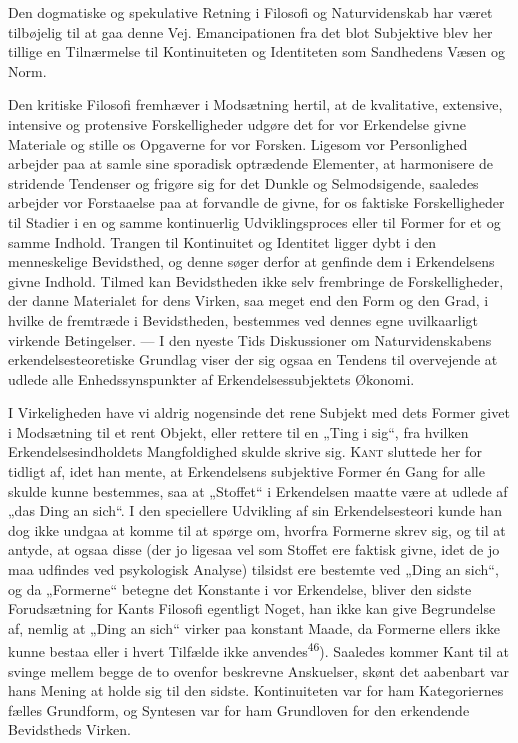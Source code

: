 \documentclass[12pt,a4paper,openany]{book}
\newcommand{\opage}[1]{\marginnote{\footnotesize\textit{[#1]}}}
\begin{document}
Den dogmatiske og spekulative Retning i Filosofi og Naturvidenskab har været
tilbøjelig til at gaa denne Vej. Emancipationen fra det blot Subjektive blev
her tillige en Tilnærmelse til Kontinuiteten og Identiteten som Sandhedens
Væsen og Norm.

Den kritiske Filosofi fremhæver i Modsætning hertil, at de kvalitative,
extensive, intensive og protensive Forskelligheder udgøre det for vor
Erkendelse givne Materiale og stille os Opgaverne for vor Forsken. Ligesom vor
Personlighed arbejder paa at samle sine sporadisk optrædende Elementer, at
harmonisere de stridende Tendenser og frigøre sig for det Dunkle og
Selmodsigende, saaledes arbejder vor Forstaaelse paa at forvandle de givne, for
os faktiske Forskelligheder til Stadier i en og samme kontinuerlig
Udviklingsproces eller til Former for et og samme Indhold. Trangen til
Kontinuitet og Identitet ligger dybt i den menneskelige Bevidsthed, og denne
søger derfor at genfinde dem i Erkendelsens givne Indhold. Tilmed kan
Bevidstheden ikke selv frembringe de Forskelligheder, der danne Materialet for
dens Virken, saa meget end den Form og den Grad, i hvilke de fremtræde i
Bevidstheden, bestemmes ved dennes egne uvilkaarligt virkende Betingelser. ---
I den nyeste Tids Diskussioner om Naturvidenskabens erkendelsesteoretiske
Grundlag viser der sig ogsaa en Tendens til overvejende at udlede alle
Enhedssynspunkter af Erkendelsessubjektets Økonomi.

I Virkeligheden have vi aldrig nogensinde det rene Subjekt
\opage{50}med dets Former givet i Modsætning til et rent Objekt, eller rettere
til en „Ting i sig“, fra hvilken Erkendelsesindholdets Mangfoldighed skulde
skrive sig. \textsc{Kant} sluttede her for tidligt af, idet han mente, at
Erkendelsens subjektive Former én Gang for alle skulde kunne bestemmes, saa at
„Stoffet“ i Erkendelsen maatte være at udlede af „das Ding an sich“. I den
speciellere Udvikling af sin Erkendelsesteori kunde han dog ikke undgaa at
komme til at spørge om, hvorfra Formerne skrev sig, og til at antyde, at ogsaa
disse (der jo ligesaa vel som Stoffet ere faktisk givne, idet de jo maa
udfindes ved psykologisk Analyse) tilsidst ere bestemte ved „Ding an sich“, og
da „Formerne“ betegne det Konstante i vor Erkendelse, bliver den sidste
Forudsætning for Kants Filosofi egentligt Noget, han ikke kan give Begrundelse
af, nemlig at „Ding an sich“ virker paa konstant Maade, da Formerne ellers ikke
kunne bestaa eller i hvert Tilfælde ikke anvendes\textsuperscript{46}).
Saaledes kommer Kant til at svinge mellem begge de to ovenfor beskrevne
Anskuelser, skønt det aabenbart var hans Mening at holde sig til den sidste.
Kontinuiteten var for ham Kategoriernes fælles Grundform, og Syntesen var for
ham Grundloven for den erkendende Bevidstheds Virken.
\end{document}
